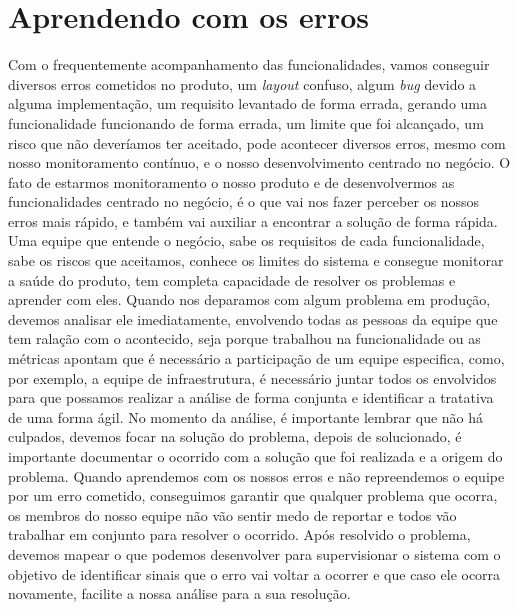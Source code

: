     \section{Aprendendo com os erros}
      Com o frequentemente acompanhamento das funcionalidades, vamos conseguir
      diversos erros cometidos no produto, um \textit{layout} confuso, algum
      \textit{bug} devido a alguma implementação, um requisito levantado de
      forma errada, gerando uma funcionalidade funcionando de forma errada, um
      limite que foi alcançado, um risco que não deveríamos ter aceitado, pode
      acontecer diversos erros, mesmo com nosso monitoramento contínuo, e o nosso
      desenvolvimento centrado no negócio. O fato de estarmos monitoramento o nosso
      produto e de desenvolvermos as funcionalidades centrado no negócio, é o que
      vai nos fazer perceber os nossos erros mais rápido, e também vai auxiliar
      a encontrar a solução de forma rápida. Uma equipe que entende o negócio,
      sabe os requisitos de cada funcionalidade, sabe os riscos que aceitamos,
      conhece os limites do sistema e consegue monitorar a saúde do produto, tem
      completa capacidade de resolver os problemas e aprender com eles. \newline
      Quando nos deparamos com algum problema em produção, devemos analisar ele
      imediatamente, envolvendo todas as pessoas da equipe que tem ralação com o
      acontecido, seja porque trabalhou na funcionalidade ou as métricas apontam
      que é necessário a participação de um equipe especifica, como, por exemplo, a
      equipe de infraestrutura, é necessário juntar todos os envolvidos para que
      possamos realizar a análise de forma conjunta e identificar a tratativa de
      uma forma ágil. No momento da análise, é importante lembrar que não há
      culpados, devemos focar na solução do problema, depois de solucionado, é
      importante documentar o ocorrido com a solução que foi realizada e a origem
      do problema. Quando aprendemos com os nossos erros e não repreendemos o
      equipe por um erro cometido, conseguimos garantir que qualquer problema que
      ocorra, os membros do nosso equipe não vão sentir medo de reportar e todos vão
      trabalhar em conjunto para resolver o ocorrido. Após resolvido o problema,
      devemos mapear o que podemos desenvolver para supervisionar o sistema com o
      objetivo de identificar sinais que o erro vai voltar a ocorrer e que caso
      ele ocorra novamente, facilite a nossa análise para a sua resolução. \newline

